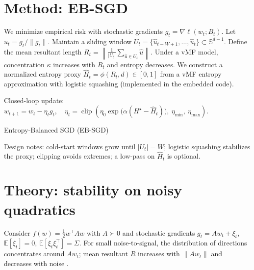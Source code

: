\section{Method: EB-SGD}
We minimize empirical risk with stochastic gradients $g_t=\nabla \ell(w_t;B_t)$. Let $\hat{u}_t=g_t/\|g_t\|$. Maintain a sliding window $U_t=\{\hat{u}_{t-W+1},\dots,\hat{u}_t\}\subset\mathbb{S}^{d-1}$. Define the mean resultant length
$
R_t=\left\|\frac{1}{|U_t|}\sum_{\hat{u}\in U_t}\hat{u}\right\|.
$
Under a vMF model, concentration $\kappa$ increases with $R_t$ and entropy decreases. We construct a normalized entropy proxy $\widehat{H}_t=\phi(R_t,d)\in[0,1]$ from a vMF entropy approximation with logistic squashing (implemented in the embedded code).

Closed-loop update:
$
w_{t+1}=w_t-\eta_t g_t,\quad
\eta_t=\operatorname{clip}\left(\eta_0\exp\big(\alpha(H^\star-\widehat{H}_t)\big),~\eta_{\min},~\eta_{\max}\right).
$

\begin{adjustbox}{width=\linewidth}
\begin{algorithm}[H]
\DontPrintSemicolon
\SetAlgoLined
{}
\caption{Entropy-Balanced SGD (EB-SGD)}
\end{algorithm}
\end{adjustbox}

Design notes: cold-start windows grow until $|U_t|=W$; logistic squashing stabilizes the proxy; clipping avoids extremes; a low-pass on $\widehat{H}_t$ is optional.

\section{Theory: stability on noisy quadratics}
Consider $f(w)=\tfrac12 w^\top A w$ with $A\succ0$ and stochastic gradients $g_t=Aw_t+\xi_t$, $\mathbb{E}[\xi_t]=0$, $\mathbb{E}[\xi_t\xi_t^\top]=\Sigma$. For small noise-to-signal, the distribution of directions concentrates around $Aw_t$; mean resultant $R$ increases with $\|Aw_t\|$ and decreases with noise \cite{MardiaJupp2000Directional}.

